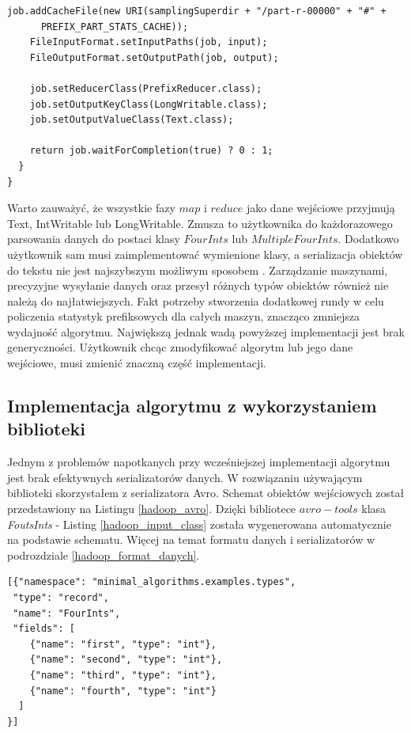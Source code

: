 \documentclass[magisterska]{pracamgr}
\begin{document}
\begin{lstlisting}[language=SmallJava,firstnumber=1,label=list_prefix,caption=Ostatnia faza liczenia statystyk prefiksowych]
    job.addCacheFile(new URI(samplingSuperdir + "/part-r-00000" + "#" + 
      PREFIX_PART_STATS_CACHE));
    FileInputFormat.setInputPaths(job, input);
    FileOutputFormat.setOutputPath(job, output);

    job.setReducerClass(PrefixReducer.class);
    job.setOutputKeyClass(LongWritable.class);
    job.setOutputValueClass(Text.class);

    return job.waitForCompletion(true) ? 0 : 1;
  }
}

\end{lstlisting}

Warto zauważyć, że wszystkie fazy \(map\) i \(reduce\) jako dane wejściowe przyjmują Text, \mbox{IntWritable} lub \mbox{LongWritable}. Zmusza to użytkownika do każdorazowego parsowania danych do postaci klasy \(FourInts\) lub \(MultipleFourInts\). Dodatkowo użytkownik sam musi zaimplementować wymienione klasy, a serializacja obiektów do tekstu nie jest najszybszym możliwym sposobem \cite{serialization}.
Zarządzanie maszynami, precyzyjne wysyłanie danych oraz przesył różnych typów obiektów również nie należą do najłatwiejszych. Fakt potrzeby stworzenia dodatkowej rundy w celu policzenia statystyk prefiksowych dla całych maszyn, znacząco zmniejsza wydajność algorytmu.
Największą jednak wadą powyższej implementacji jest brak generyczności. Użytkownik chcąc zmodyfikować algorytm lub jego dane wejściowe, musi zmienić znaczną część implementacji.

\newpage
\subsection{Implementacja algorytmu z wykorzystaniem biblioteki}

Jednym z problemów napotkanych przy wcześniejszej implementacji algorytmu jest brak efektywnych serializatorów danych. W rozwiązaniu używającym biblioteki skorzystałem z serializatora Avro. Schemat obiektów wejściowych został przedstawiony na Listingu \ref{hadoop_avro}. Dzięki bibliotece \(avro-tools\) klasa \textit{FoutsInts} - Listing \ref{hadoop_input_class} została wygenerowana automatycznie na podstawie schematu. Więcej na temat formatu danych i serializatorów w podrozdziale \ref{hadoop_format_danych}.

\begin{lstlisting}[language=SmallJava,firstnumber=1,label=hadoop_avro,caption=Schemat AVRO obiektów wejściowych]
[{"namespace": "minimal_algorithms.examples.types",
 "type": "record",
 "name": "FourInts",
 "fields": [
    {"name": "first", "type": "int"},
    {"name": "second", "type": "int"},
    {"name": "third", "type": "int"},
    {"name": "fourth", "type": "int"}
  ]
}]
\end{lstlisting}
\end{document}
